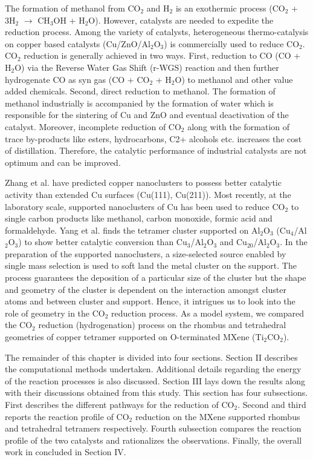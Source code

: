 The formation of methanol from CO$_2$ and H$_2$ is an exothermic process (CO$_{2}$ + 3H$_{2}$  $\rightarrow$ CH$_{3}$OH + H$_{2}$O). However, catalysts are needed to expedite the reduction process. Among the variety of catalysts, heterogeneous thermo-catalysis on copper based catalysts (Cu/ZnO/Al$_2$O$_3$) is commercially used to reduce CO$_2$\cite{gallucci2004experimental}. CO$_2$ reduction is generally achieved in two ways. First, reduction to CO (CO + H$_2$O) via the Reverse Water Gas Shift (r-WGS) reaction and then further hydrogenate CO as syn gas (CO + CO$_2$ + H$_2$O) to methanol and other value added chemicals\cite{lee2014handbook,goehna1994producing}. Second, direct reduction to methanol\cite{rodemerck2013catalyst}. The formation of methanol industrially is accompanied by the formation of water which is responsible for the sintering of Cu and ZnO and eventual deactivation of the catalyst. Moreover, incomplete reduction of CO$_2$ along with the formation of trace by-products like esters, hydrocarbons, C2+ alcohols etc. increases the cost of distillation. Therefore, the catalytic performance of industrial catalysts are not optimum and can be improved. 

Zhang et al.\cite{zhang2018optimum} have predicted copper nanoclusters to possess better catalytic activity than extended Cu surfaces (Cu(111), Cu(211)). Most recently\cite{behrens2012active,tao2019best,posada2016conversion,yang2010fundamental}, at the laboratory scale, supported nanoclusters of Cu has been used to reduce CO$_2$ to single carbon products like methanol, carbon monoxide, formic acid and formaldehyde. Yang et al.\cite{yang2017copper} finds the tetramer cluster supported on Al$_2$O$_3$ (Cu$_4$/Al$_2$O$_3$) to show better catalytic conversion than Cu$_3$/Al$_2$O$_3$ and Cu$_{20}$/Al$_2$O$_3$. In the preparation of the supported nanoclusters, a size-selected source enabled by single mass selection is used to soft land the metal cluster on the support\cite{yin2014atomically,lu2014effect}. The process guarantees the deposition of a particular size of the cluster but the shape and geometry of the cluster is dependent on the interaction amongst cluster atoms and between cluster and support. Hence, it intrigues us to look into the role of geometry in the CO$_2$ reduction process. As a model system, we compared the CO$_2$ reduction (hydrogenation) process on the rhombus and tetrahedral geometries of copper tetramer supported on O-terminated MXene (Ti$_2$CO$_2$).   

The remainder of this chapter is divided into four sections. Section II describes the computational methods undertaken. Additional details regarding the energy of the reaction processes is also discussed. Section III lays down the results along with their discussions obtained from this study. This section has four subsections. First describes the different pathways for the reduction of CO$_2$. Second and third reports the reaction profile of CO$_2$ reduction on the MXene supported rhombus and tetrahedral tetramers respectively. Fourth subsection compares the reaction profile of the two catalysts and rationalizes the observations. Finally, the overall work in concluded in Section IV. 

